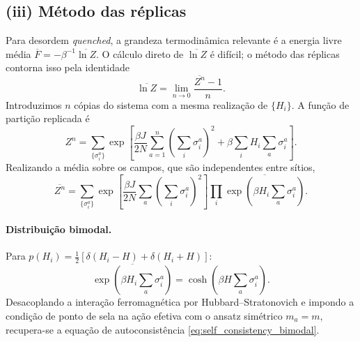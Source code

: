 \documentclass[12pt,a4paper]{article}
\begin{document}
\subsection*{(iii) Método das réplicas}

Para desordem \emph{quenched}, a grandeza termodinâmica relevante é
a energia livre média $\overline{F} = -\beta^{-1}\overline{\ln Z}$.
O cálculo direto de $\overline{\ln Z}$ é difícil; o método das
réplicas contorna isso pela identidade
%
\begin{equation}
    \overline{\ln Z}
    =
    \lim_{n\to 0}\frac{\overline{Z^n}-1}{n}.
    \label{eq:replica_identity}
\end{equation}
%
Introduzimos $n$ cópias do sistema com a mesma realização de $\{H_i\}$.
A função de partição replicada é
%
\begin{equation}
    Z^n
    =
    \sum_{\{\sigma_i^a\}}
    \exp\!\left[
        \frac{\beta J}{2N}
        \sum_{a=1}^{n}
        \!\left(\sum_{i}\sigma_i^a\right)^{\!2}
        +
        \beta\sum_{i}H_i\sum_{a}\sigma_i^a
    \right].
    \label{eq:Zn}
\end{equation}
%
Realizando a média sobre os campos, que são independentes entre sítios,
%
\begin{equation}
    \overline{Z^n}
    =
    \sum_{\{\sigma_i^a\}}
    \exp\!\left[
        \frac{\beta J}{2N}
        \sum_{a}\!\left(\sum_i\sigma_i^a\right)^{\!2}
    \right]
    \prod_{i}
    \overline{\exp\!\left(\beta H_i\sum_a\sigma_i^a\right)}.
    \label{eq:Zn_avg}
\end{equation}

\paragraph{Distribuição bimodal.}
Para $p(H_i)=\frac{1}{2}[\delta(H_i-H)+\delta(H_i+H)]$:
%
\begin{equation}
    \overline{\exp\!\left(\beta H_i\sum_a\sigma_i^a\right)}
    =
    \cosh\!\left(\beta H\sum_a\sigma_i^a\right).
    \label{eq:avg_bimodal}
\end{equation}
%
Desacoplando a interação ferromagnética por Hubbard--Stratonovich
e impondo a condição de ponto de sela na ação efetiva com o ansatz
simétrico $m_a = m$, recupera-se a equação de autoconsistência
\eqref{eq:self_consistency_bimodal}.
\end{document}
